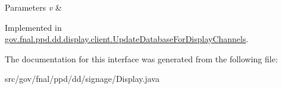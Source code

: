 \begin{DoxyParams}{Parameters}
{\em v} & \\
\hline
\end{DoxyParams}


Implemented in \hyperlink{classgov_1_1fnal_1_1ppd_1_1dd_1_1display_1_1client_1_1UpdateDatabaseForDisplayChannels_a20deb9f5431d716492d8af09ee38683d}{gov.\-fnal.\-ppd.\-dd.\-display.\-client.\-Update\-Database\-For\-Display\-Channels}.



The documentation for this interface was generated from the following file\-:\begin{DoxyCompactItemize}
\item 
src/gov/fnal/ppd/dd/signage/Display.\-java\end{DoxyCompactItemize}
